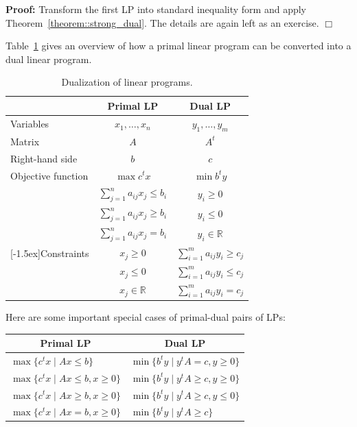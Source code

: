 \documentclass[12pt, showidx, twoside]{article}
\def\prove{\par \noindent \hbox{\bf Proof:}\quad}
\def\endproof{\hfill{$\Box$}}
\def\R{\mathbb{R}}
\newcommand{\up}{\raisebox{1.5ex}[-1.5ex]}
\begin{document}
{{{{\prove
Transform the first LP into standard inequality form and 
apply Theorem~\ref{theorem::strong_dual}. The details are again
left as an exercise.
\endproof






Table~\ref{tab::Dual}
gives an overview of how a primal linear program
can be converted into a dual linear program.

\begin{table}[htb]
\begin{center}
\begin{tabular}{|l||c|c|}\hline
                   & Primal LP                              &  Dual LP \\ \hline \hline
Variables          & $x_1,\dots,x_n$                        & $y_1,\dots,y_m$\\ \hline
Matrix             &   $A$                                  &    $A^t$\\ \hline
Right-hand side    &   $b$                                  &      $c$\\ \hline
Objective function &   $\max c^t x$                         & $\min b^t y$\\ \hline
                   &  $\sum\limits_{j=1}^n a_{ij}x_j \leq b_i$ & $y_i \geq 0$\\
                   &  $\sum\limits_{j=1}^n a_{ij}x_j \geq b_i$ & $y_i \leq 0$\\
                   &  $\sum\limits_{j=1}^n a_{ij}x_j = b_i$    & $y_i \in \R$\\
\up{Constraints}   &   $x_j \geq 0$                         & $\sum\limits_{i=1}^m a_{ij} y_i \geq c_j$\\
                   &   $x_j \leq 0$                         & $\sum\limits_{i=1}^m a_{ij} y_i \leq c_j$\\
                   &   $x_j \in \R$                         & $\sum\limits_{i=1}^m a_{ij} y_i = c_j$\\ \hline
\end{tabular}
\end{center}
\caption{Dualization of linear programs.}\label{tab::Dual}
\end{table}


Here are some important special cases of primal-dual pairs of LPs:

\begin{tabular}{|l|l|} \hline
\multicolumn{1}{|c|}{Primal LP}         & \multicolumn{1}{c|}{Dual LP}\\ \hline \hline
$\max\{c^t x \mid Ax\leq b\}$           & $\min\{b^t y \mid y^t A = c, y \geq 0\}$\\ \hline
$\max\{c^t x \mid Ax\leq b, x \geq 0\}$ & $\min\{b^t y \mid y^t A \geq c, y \geq 0\}$\\ \hline
$\max\{c^t x \mid Ax\geq b, x \geq 0\}$ & $\min\{b^t y \mid y^t A \geq c, y \leq 0\}$\\ \hline
$\max\{c^t x \mid Ax= b, x \geq 0\}$    & $\min\{b^t y \mid y^t A \geq c\}$\\ \hline
\end{tabular}



}}}}
\end{document}
